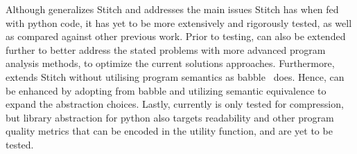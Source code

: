 Although \toolname generalizes Stitch \cite{Bowers_2023stitch} and addresses 
the main issues Stitch has when fed with python code, it has yet to be more extensively and rigorously tested, 
as well as compared against other previous work. Prior to testing, \toolname can also be extended further to better address 
the stated problems with more advanced program analysis methods, to optimize the current solutions approaches. Furthermore, \toolname extends Stitch without utilising program semantics as babble~\cite{Cao_2023babble} does. Hence, \toolname can be enhanced by adopting from babble and utilizing semantic equivalence to expand the abstraction choices. Lastly, currently \toolname is only tested for compression, but library abstraction for python also targets readability and other program quality metrics that can be encoded in the utility function, and are yet to be tested. 







